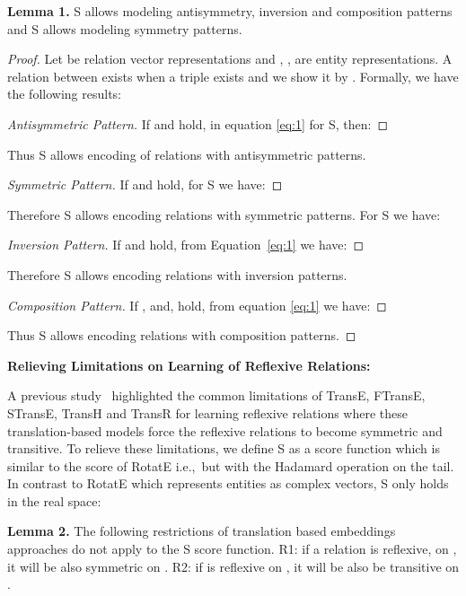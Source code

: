 \documentclass{ecai}
\begin{document}
\textbf{Lemma 1.} S allows modeling antisymmetry, inversion and composition patterns and S allows modeling symmetry patterns.
\begin{proof}
Let  be relation vector representations and , ,  are entity representations. A relation  between  exists when a triple  exists and we show it by . Formally, we have the following results:
\begin{proof}[Antisymmetric Pattern]\let\qed\relax
If  and  hold, in equation \ref{eq:1} for S, then:

\end{proof}
\noindent
Thus S allows encoding of relations with antisymmetric patterns.
\begin{proof}[Symmetric Pattern]\let\qed\relax
If  and  hold, for S we have:
  
\end{proof}
\noindent
Therefore S allows encoding relations with symmetric patterns. For S we have:
\begin{proof}[Inversion Pattern]\let\qed\relax
If  and  hold, from Equation~\ref{eq:1} we have:

\end{proof}
\noindent
Therefore S allows encoding relations with inversion patterns.

\begin{proof}[Composition Pattern]\let\qed\relax
If  ,  and,  hold, from equation \ref{eq:1} we have:

\end{proof}
\noindent
Thus S allows encoding relations with composition patterns.
\end{proof} 

\textbf{Relieving Limitations on Learning of Reflexive Relations:}\label{Relieving_Limitation_TransE}

A previous study~\cite{kazemi2018simple} highlighted the common limitations of TransE, FTransE, STransE, TransH and TransR for learning reflexive relations where these translation-based models force the reflexive relations to become symmetric and transitive. To relieve these limitations, we define S as a score function which is similar to the score of RotatE i.e.,\  but with the Hadamard operation on the tail. In contrast to RotatE which represents entities as complex vectors, S only holds in the real space:

 

\textbf{Lemma 2.} The following restrictions of translation based embeddings approaches do not apply to the S score function. 
R1: if a relation  is reflexive, on ,  it will be also symmetric on .
R2: if  is reflexive on ,  it will be also be transitive on .  
\end{document}
